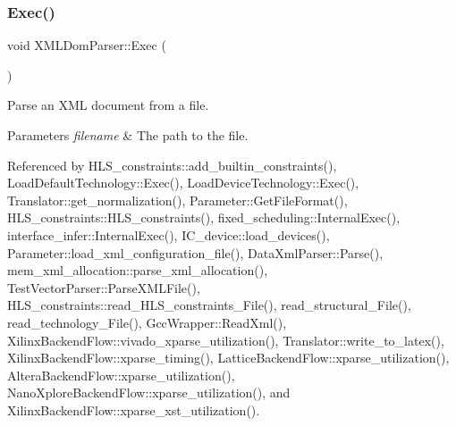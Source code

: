 \subsubsection{\texorpdfstring{Exec()}{Exec()}}
{\footnotesize\ttfamily void X\+M\+L\+Dom\+Parser\+::\+Exec (\begin{DoxyParamCaption}{ }\end{DoxyParamCaption})}



Parse an X\+ML document from a file. 


\begin{DoxyParams}{Parameters}
{\em filename} & The path to the file. \\
\hline
\end{DoxyParams}


Referenced by H\+L\+S\+\_\+constraints\+::add\+\_\+builtin\+\_\+constraints(), Load\+Default\+Technology\+::\+Exec(), Load\+Device\+Technology\+::\+Exec(), Translator\+::get\+\_\+normalization(), Parameter\+::\+Get\+File\+Format(), H\+L\+S\+\_\+constraints\+::\+H\+L\+S\+\_\+constraints(), fixed\+\_\+scheduling\+::\+Internal\+Exec(), interface\+\_\+infer\+::\+Internal\+Exec(), I\+C\+\_\+device\+::load\+\_\+devices(), Parameter\+::load\+\_\+xml\+\_\+configuration\+\_\+file(), Data\+Xml\+Parser\+::\+Parse(), mem\+\_\+xml\+\_\+allocation\+::parse\+\_\+xml\+\_\+allocation(), Test\+Vector\+Parser\+::\+Parse\+X\+M\+L\+File(), H\+L\+S\+\_\+constraints\+::read\+\_\+\+H\+L\+S\+\_\+constraints\+\_\+\+File(), read\+\_\+structural\+\_\+\+File(), read\+\_\+technology\+\_\+\+File(), Gcc\+Wrapper\+::\+Read\+Xml(), Xilinx\+Backend\+Flow\+::vivado\+\_\+xparse\+\_\+utilization(), Translator\+::write\+\_\+to\+\_\+latex(), Xilinx\+Backend\+Flow\+::xparse\+\_\+timing(), Lattice\+Backend\+Flow\+::xparse\+\_\+utilization(), Altera\+Backend\+Flow\+::xparse\+\_\+utilization(), Nano\+Xplore\+Backend\+Flow\+::xparse\+\_\+utilization(), and Xilinx\+Backend\+Flow\+::xparse\+\_\+xst\+\_\+utilization().

